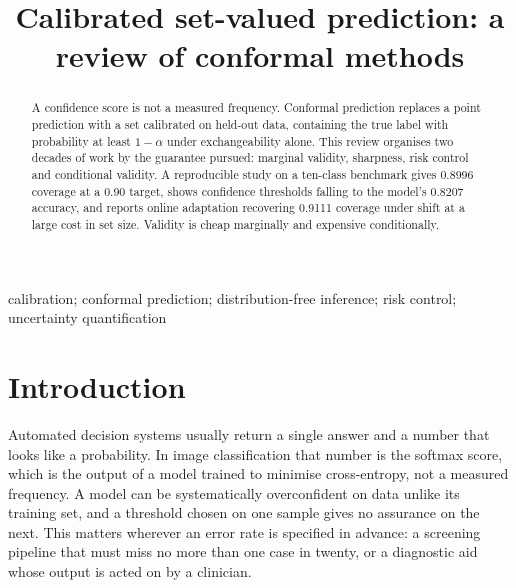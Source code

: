 %

\title{Calibrated set-valued prediction: a review of conformal methods}

\begin{abstract}
A confidence score is not a measured frequency. Conformal prediction replaces a
point prediction with a set calibrated on held-out data, containing the true label
with probability at least $1-\alpha$ under exchangeability alone. This review
organises two decades of work by the guarantee pursued: marginal validity,
sharpness, risk control and conditional validity. A reproducible study on a
ten-class benchmark gives 0.8996 coverage at a 0.90 target, shows confidence
thresholds falling to the model's 0.8207 accuracy, and reports online adaptation
recovering 0.9111 coverage under shift at a large cost in set size. Validity is
cheap marginally and expensive conditionally.
\end{abstract}

\begin{keywords}
calibration; conformal prediction; distribution-free inference; risk control;
uncertainty quantification
\end{keywords}

\section{Introduction}

Automated decision systems usually return a single answer and a number that looks
like a probability. In image classification that number is the softmax score, which
is the output of a model trained to minimise cross-entropy, not a measured
frequency. A model can be systematically overconfident on data unlike its training
set, and a threshold chosen on one sample gives no assurance on the next. This
matters wherever an error rate is specified in advance: a screening pipeline that
must miss no more than one case in twenty, or a diagnostic aid whose output is
acted on by a clinician.

